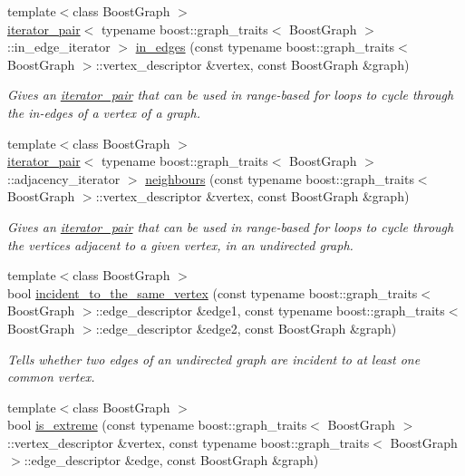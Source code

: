 \begin{DoxyCompactItemize}
{\footnotesize template$<$class Boost\+Graph $>$ }\\\hyperlink{classas_1_1iterator__pair}{iterator\+\_\+pair}$<$ typename boost\+::graph\+\_\+traits$<$ Boost\+Graph $>$\+::in\+\_\+edge\+\_\+iterator $>$ \hyperlink{namespaceas_1_1graph_ab75a465b1d5869f0ea8b698f02b067aa}{in\+\_\+edges} (const typename boost\+::graph\+\_\+traits$<$ Boost\+Graph $>$\+::vertex\+\_\+descriptor \&vertex, const Boost\+Graph \&graph)
\begin{DoxyCompactList}\small\item\em Gives an \hyperlink{classas_1_1iterator__pair}{iterator\+\_\+pair} that can be used in range-\/based for loops to cycle through the in-\/edges of a vertex of a graph. \end{DoxyCompactList}\item 
{\footnotesize template$<$class Boost\+Graph $>$ }\\\hyperlink{classas_1_1iterator__pair}{iterator\+\_\+pair}$<$ typename boost\+::graph\+\_\+traits$<$ Boost\+Graph $>$\+::adjacency\+\_\+iterator $>$ \hyperlink{namespaceas_1_1graph_a7a86ebb168cf6ac390a5bd86d3380350}{neighbours} (const typename boost\+::graph\+\_\+traits$<$ Boost\+Graph $>$\+::vertex\+\_\+descriptor \&vertex, const Boost\+Graph \&graph)
\begin{DoxyCompactList}\small\item\em Gives an \hyperlink{classas_1_1iterator__pair}{iterator\+\_\+pair} that can be used in range-\/based for loops to cycle through the vertices adjacent to a given vertex, in an undirected graph. \end{DoxyCompactList}\item 
{\footnotesize template$<$class Boost\+Graph $>$ }\\bool \hyperlink{namespaceas_1_1graph_ac0b52ec1e242ac547157a42aac39e21a}{incident\+\_\+to\+\_\+the\+\_\+same\+\_\+vertex} (const typename boost\+::graph\+\_\+traits$<$ Boost\+Graph $>$\+::edge\+\_\+descriptor \&edge1, const typename boost\+::graph\+\_\+traits$<$ Boost\+Graph $>$\+::edge\+\_\+descriptor \&edge2, const Boost\+Graph \&graph)
\begin{DoxyCompactList}\small\item\em Tells whether two edges of an undirected graph are incident to at least one common vertex. \end{DoxyCompactList}\item 
{\footnotesize template$<$class Boost\+Graph $>$ }\\bool \hyperlink{namespaceas_1_1graph_af020abed3b5b57f984d8ce940ee6f4cd}{is\+\_\+extreme} (const typename boost\+::graph\+\_\+traits$<$ Boost\+Graph $>$\+::vertex\+\_\+descriptor \&vertex, const typename boost\+::graph\+\_\+traits$<$ Boost\+Graph $>$\+::edge\+\_\+descriptor \&edge, const Boost\+Graph \&graph)

\end{DoxyCompactItemize}
